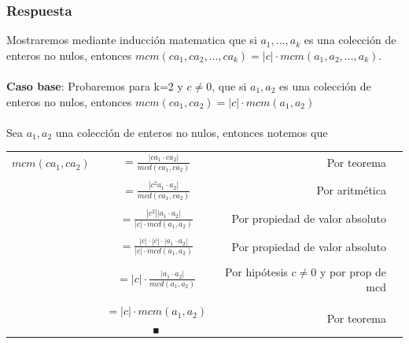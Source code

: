 \documentclass[12pt]{article}
\begin{document}
	\subsubsection*{Respuesta}
	Mostraremos mediante inducción matematica que si $a_1,...,a_k$ es una colección de enteros no nulos, entonces $mcm(ca_1, ca_2, \dots, ca_k ) = |c| \cdot mcm(a_1, a_2, \dots, a_k )$. \\
	\\
	\textbf{Caso base}: Probaremos para k=2 y $c \neq 0$, que si $a_1, a_2$ es una colección de enteros no nulos, entonces  $mcm(ca_1, ca_2) = |c| \cdot mcm(a_1, a_2)$\\
	\\
	Sea  $a_1, a_2$ una colección de enteros no nulos, entonces notemos que
	
	\begin{table}[h]
		\begin{tabular}{lcrp{6cm}}
			$mcm (ca_1, ca_2)$ & $=\frac{|ca_1 \cdot ca_2|}{mcd(ca_1,ca_2)}$ & Por teorema \\
			\\
			\ \ & $=\frac{|c^2 a_1 \cdot a_2|}{mcd(ca_1,ca_2)}$ & Por aritmética \\
			\\
			\ \ & $=\frac{|c^2| |a_1\cdot a_2|}{|c| \cdot mcd(a_1,a_2)}$ & Por propiedad de valor absoluto\\
			\\
			\ \ & $=\frac{|c| \cdot |c| \cdot |a_1\cdot a_2|}{|c| \cdot mcd(a_1,a_2)}$ & Por propiedad de valor absoluto\\
			\\
			\ \ & $= |c| \cdot \frac{|a_1\cdot a_2|}{mcd(a_1,a_2)}$ & Por hipótesis $c \neq 0$ y por prop de mcd \\
			\\
			\ \ & $=|c| \cdot mcm(a_1,a_2)$ $_\blacksquare$ & Por teorema \\
			
		\end{tabular}
	\end{table}
	
\end{document}
